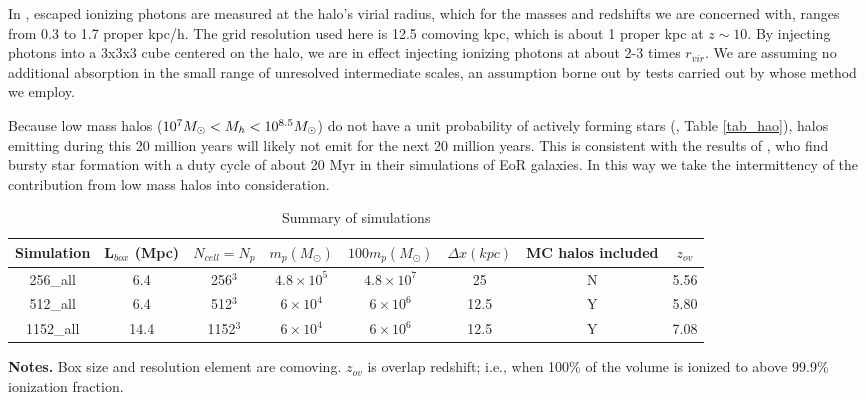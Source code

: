 \documentclass[iop,apj]{emulateapj}
\begin{document}
In \cite{Xu16}, escaped ionizing photons are measured at the halo's virial radius, which for the masses and redshifts we are concerned with, ranges from 0.3 to 1.7 proper kpc/h. The grid resolution used here is 12.5 comoving kpc, which is about 1 proper kpc at $z \sim 10$. By injecting photons into a 3x3x3 cube centered on the halo, we are in effect injecting ionizing photons at about 2-3 times $r_{vir}$. We are assuming no additional absorption in the small range of unresolved intermediate scales, an assumption borne out by tests carried out by \cite{Wise14} whose method we employ. 

Because low mass halos ($10^7M_\odot<M_h<10^{8.5}M_\odot$) do not have a unit probability of actively forming stars (\citet{Xu16}, Table \ref{tab_hao}), halos emitting during this 20 million years will likely not emit for the next 20 million years. This is consistent with the results of \cite{KimmCen14}, who find bursty star formation with a duty cycle of about 20 Myr in their simulations of EoR galaxies. In this way we take the intermittency of the contribution from low mass halos into consideration. 

\begin{table*}
\centering
\caption{Summary of simulations}
\label{tab_sim}
\begin{tabular}{cccccccc}
\hline\hline
Simulation & L$_{box}$ (Mpc) & $N_{cell}=N_{p}$ & $m_p (M_{\odot})$ & $100m_p (M_{\odot})$  & $\Delta x (kpc)$ &  MC halos included & $z_{ov}$  \\
\hline
256\_all & 6.4 & 256$^3$ & $4.8 \times 10^5$  & $4.8 \times 10^7$ & 25 & N & 5.56  \\
\hline
512\_all & 6.4 & 512$^3$ & $6 \times 10^4$ & $6 \times 10^6$ & 12.5 & Y & 5.80  \\
\hline
1152\_all & 14.4 & 1152$^3$ & $6 \times 10^4$ & $6 \times 10^6$ & 12.5 & Y & 7.08  \\
\hline
\hline
\end{tabular}
\parbox[t]{0.73\textwidth}{\textbf{Notes.} 
Box size and resolution element are comoving. $z_{ov}$ is overlap redshift; i.e., when 100\% of the volume is ionized to above 99.9\% ionization fraction. 
}
\end{table*}
\end{document}
